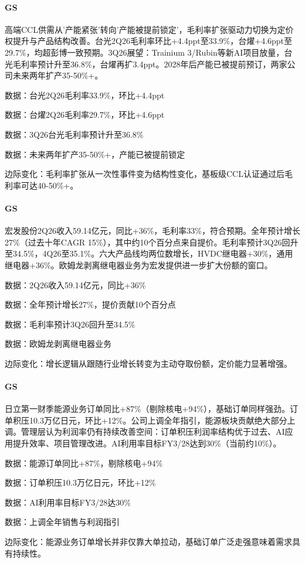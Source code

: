 \documentclass[11pt]{ctexart}
\begin{document}
\paragraph{GS} 高端CCL供需从'产能紧张'转向'产能被提前锁定'，毛利率扩张驱动力切换为定价权提升与产品结构改善。台光2Q26毛利率环比+4.4ppt至33.9\%，台燿+4.6ppt至29.7\%，均超彭博一致预期。3Q26展望：Trainium 3/Rubin等新AI项目放量，台光毛利率预计升至36.8\%，台燿再扩3.4ppt。2028年后产能已被提前预订，两家公司未来两年扩产35-50\%+。
{\small\color{refgray}数据：台光2Q26毛利率33.9\%，环比+4.4ppt\par}
{\small\color{refgray}数据：台燿2Q26毛利率29.7\%，环比+4.6ppt\par}
{\small\color{refgray}数据：3Q26台光毛利率预计升至36.8\%\par}
{\small\color{refgray}数据：未来两年扩产35-50\%+，产能已被提前锁定\par}
{\small\color{refgray}边际变化：毛利率扩张从一次性事件变为结构性变化，基板级CCL认证通过后毛利率可达40-50\%+。\par}
\paragraph{GS} 宏发股份2Q26收入59.14亿元，同比+36\%，毛利率33\%，符合预期。全年预计增长27\%（过去十年CAGR 15\%），其中约10个百分点来自提价。毛利率预计3Q26回升至34.5\%，4Q26至35.1\%。六大产品线均两位数增长，HVDC继电器+30\%，通用继电器+36\%。欧姆龙剥离继电器业务为宏发提供进一步扩大份额的窗口。
{\small\color{refgray}数据：2Q26收入59.14亿元，同比+36\%\par}
{\small\color{refgray}数据：全年预计增长27\%，提价贡献10个百分点\par}
{\small\color{refgray}数据：毛利率预计3Q26回升至34.5\%\par}
{\small\color{refgray}数据：欧姆龙剥离继电器业务\par}
{\small\color{refgray}边际变化：增长逻辑从跟随行业增长转变为主动夺取份额，定价能力显著增强。\par}
\paragraph{GS} 日立第一财季能源业务订单同比+87\%（剔除核电+94\%），基础订单同样强劲。订单积压10.3万亿日元，环比+12\%。公司上调全年指引，能源板块贡献绝大部分上调。管理层认为利润率仍有持续改善空间：订单积压利润率结构优于过去、AI应用提升效率、项目管理改进。AI利用率目标FY3/28达到30\%（当前约10\%）。
{\small\color{refgray}数据：能源订单同比+87\%，剔除核电+94\%\par}
{\small\color{refgray}数据：订单积压10.3万亿日元，环比+12\%\par}
{\small\color{refgray}数据：AI利用率目标FY3/28达30\%\par}
{\small\color{refgray}数据：上调全年销售与利润指引\par}
{\small\color{refgray}边际变化：能源业务订单增长并非仅靠大单拉动，基础订单广泛走强意味着需求具有持续性。\par}
\end{document}
